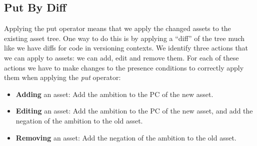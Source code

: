 \subsection{Put By Diff}
Applying the put operator means that we apply the changed assets to the
existing asset tree. One way to do this is by applying a ``diff'' of the tree
much like we have diffs for code in versioning contexts. We identify three
actions that we can apply to assets: we can add, edit and remove them. For each
of these actions we have to make changes to the presence conditions to
correctly apply them when applying the \emph{put} operator:
\begin{itemize}
  \item \textbf{Adding} an asset: Add the ambition to the PC of the new asset.
  \item \textbf{Editing} an asset: Add the ambition to the PC of the new asset,
        and add the negation of the ambition to the old asset.
  \item \textbf{Removing} an asset: Add the negation of the ambition to the old
        asset.
\end{itemize}

